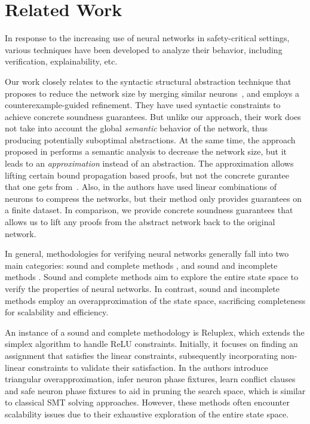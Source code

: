 \section{Related Work}

In response to the increasing use of neural networks in safety-critical settings, 
various techniques have been developed to analyze their behavior, including 
verification, explainability, etc. 

Our work closely relates to the syntactic structural abstraction technique that
proposes to reduce the network size by merging similar neurons~\cite{cegar-nn,
cegarette}, and employs a counterexample-guided refinement. They have used
syntactic constraints to achieve concrete soundness guarantees. But unlike our
approach, their work does not take into account the global \textit{semantic}
behavior of the network, thus producing potentially suboptimal abstractions.
At the same time, the approach proposed in \cite{deep-abstract} performs a
semantic analysis to decrease the network size, but it leads to an
\emph{approximation} instead of an abstraction. The approximation allows
lifting certain bound propagation based proofs, but not the concrete gurantee
that one gets from~\cite{cegar-nn}. Also, in \cite{lin-comb-abs-jan} the
authors have used linear combinations of neurons to compress the networks, but
their method only provides guarantees on a finite dataset. In comparison, we
provide concrete soundness guarantees that allows us to lift any proofs from
the abstract network back to the original network.

In general, methodologies for verifying neural networks generally fall into two
main categories: sound and complete methods \cite{reluplex,
    formal-ver-piece-wise, 
comp-reachability-analysis, comp-milp, comp-out-range, comp-max-resilience, marabou,
comp-safety-ver-dnn, beta-crown, alpha-crown-bab-fnc, gcp-crown}, and sound and
incomplete methods \cite{deeppoly, crown, incomp-dual-approach, incomp-abs-inp, 
incomp-robustness-certi, incomp-boost-robustness}. Sound and complete methods aim to 
explore the entire state space to verify the properties of neural networks.
In contrast, sound and incomplete methods employ an overapproximation
of the state space, sacrificing completeness for 
scalability and efficiency.

An instance of a sound and complete methodology is Reluplex, which extends the 
simplex algorithm \cite{simplex} to 
handle ReLU constraints. Initially, it focuses on finding an assignment that 
satisfies the linear constraints, subsequently incorporating non-linear constraints 
to validate their satisfaction. In \cite{formal-ver-piece-wise}
the authors introduce triangular overapproximation, infer neuron phase fixtures,
learn conflict clauses and safe neuron phase fixtures to aid in pruning the search 
space, which is similar to classical SMT solving approaches. However, these methods
often encounter scalability issues due to their exhaustive exploration of the
entire state space. 

